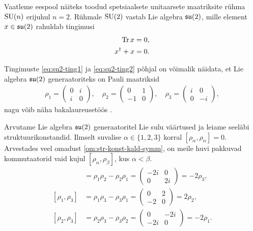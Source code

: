 \begin{naide}
    Vaatleme eespool näiteks toodud spetsiaalsete unitaarsete maatriksite
    rühma $\operatorname{SU}(n)$ erijuhul $n = 2$. Rühmale $\operatorname{SU}(2)$ vastab Lie algebra
    $\mathfrak{su}(2)$, mille
    element $x \in \mathfrak{su}(2)$ rahuldab tingimusi
    \begin{align}
        \operatorname{Tr} x = 0,\label{eq:su2-ting1} \\
        x^\dag + x = 0.\label{eq:su2-ting2}
    \end{align}

    Tingimuste \eqref{eq:su2-ting1} ja \eqref{eq:su2-ting2} põhjal
    on võimalik näidata, et Lie algebra $\mathfrak{su}(2)$ generaatoriteks
    on Pauli maatriksid
    \begin{align*}
        \rho_1 = \begin{pmatrix}
            0 & i \\
            i & 0
        \end{pmatrix},
        \quad
        \rho_2 = \begin{pmatrix}
            0 & 1 \\
            -1 & 0
        \end{pmatrix},
        \quad
        \rho_3 = \begin{pmatrix}
            i & 0 \\
            0 & -i
        \end{pmatrix},
    \end{align*}
    nagu võib näha bakalaureusetöös \cite{latt2013}.

    Arvutame Lie algebra $\mathfrak{su}(2)$ generaatoritel Lie sulu väärtused
    ja leiame seeläbi struktuurikonstandid. Ilmselt suvalise
    $\alpha \in \{1, 2, 3\}$ korral $[\rho_\alpha, \rho_\alpha] = 0$.
    Arvestades veel omadust \eqref{om:str-konst-kald-symm}, on meile
    huvi pakkuvad kommutaatorid vaid kujul
    $[\rho_\alpha, \rho_\beta]$, kus $\alpha < \beta$.
    \begin{align}
        [\rho_1, \rho_2] &= \rho_1 \rho_2 - \rho_2 \rho_1 =
            \begin{pmatrix}
                -2i &  0 \\
                  0 & 2i
            \end{pmatrix} = -2 \rho_3,
            \label{eq:str-konst-naide-brac-1}\\[0.1cm]
        [\rho_1, \rho_3] &= \rho_1 \rho_3 - \rho_3 \rho_1 =
            \begin{pmatrix}
                 0 & 2 \\
                -2 & 0
            \end{pmatrix} = 2 \rho_2,
            \label{eq:str-konst-naide-brac-2}\\[0.1cm]
        [\rho_2, \rho_3] &= \rho_2 \rho_3 - \rho_3 \rho_2 =
            \begin{pmatrix}
                  0 & -2i \\
                -2i & 0
            \end{pmatrix} = -2 \rho_1.
            \label{eq:str-konst-naide-brac-3}
    \end{align}


\end{naide}
